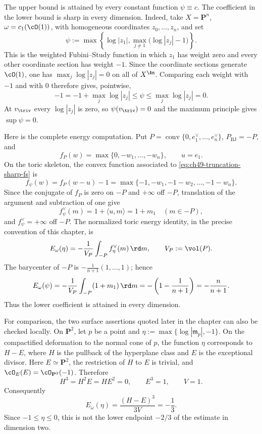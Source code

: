 \begin{remark}
\label{rem:ch49-truncation-sharp}
The upper bound is attained by every constant function $\psi\equiv c$.
The coefficient in the lower bound is sharp in every dimension.  Indeed,
take $X=\mathbf P^n$, $\omega=c_1(\cO(1))$, with homogeneous
coordinates $z_0,\ldots,z_n$, and set
\[
 \psi:=\max\!\left\{\log|z_1|,
              \max_{j\ne1}\bigl(\log|z_j|-1\bigr)\right\}.
\tag{49.6e}\label{eq:ch49-truncation-sharp-fs}
\]
This is the weighted Fubini--Study function in which $z_1$ has weight
zero and every other coordinate section has weight $-1$.  Since the
coordinate sections generate $\cO(1)$, one has
$\max_j\log|z_j|=0$ on all of $X^{\An}$.  Comparing each weight with
$-1$ and with $0$ therefore gives, pointwise,
\[
 -1=-1+\max_j\log|z_j|\le\psi
 \le\max_j\log|z_j|=0.
\]
At $v_{\triv}$ every $\log|z_j|$ is zero, so $\psi(v_{\triv})=0$
and the maximum principle gives $\sup\psi=0$.

Here is the complete energy computation.  Put
$P=\operatorname{conv}\{0,e_1^\vee,\ldots,e_n^\vee\}$,
$P_{\mathrm{BJ}}=-P$, and
\[
 f_P(w)=\max\{0,-w_1,\ldots,-w_n\},\qquad u=e_1.
\]
On the toric skeleton, the convex function associated to
\eqref{eq:ch49-truncation-sharp-fs} is
\[
 f_\psi(w)=f_P(w-u)-1
 =\max\{-1,-w_1,-1-w_2,\ldots,-1-w_n\}.
\]
Since the conjugate of $f_P$ is zero on $-P$ and $+\infty$
off $-P$, translation of the argument and subtraction of one give
\[
 f_\psi^\vee(m)=1+\langle u,m\rangle=1+m_1
 \quad(m\in-P),
\]
and $f_\psi^\vee=+\infty$ off $-P$.  The normalized toric energy
identity, in the precise convention of this chapter, is
\[
 E_\omega(\eta)=-\frac1{V_P}\int_{-P}f_\eta^\vee(m)\,\rd m,
 \qquad V_P:=\vol(P).
\]
The barycenter of $-P$ is
$-\frac1{n+1}(1,\ldots,1)$; hence
\[
 E_\omega(\psi)
 =-\frac1{V_P}\int_{-P}(1+m_1)\,\rd m
 =-\left(1-\frac1{n+1}\right)
 =-\frac n{n+1}.
\]
Thus the lower coefficient is attained in every dimension.

For comparison, the two surface assertions quoted later in the chapter
can also be checked locally.  On $\mathbf P^2$, let $p$ be a point
and
$\eta:=\max\{\log|\mathfrak m_p|,-1\}$.  On the compactified
deformation to the normal cone of $p$, the function $\eta$ corresponds
to $H-E$, where $H$ is the pullback of the hyperplane class and $E$
is the exceptional divisor.  Here $E\simeq\mathbf P^2$, the restriction
of $H$ to $E$ is trivial, and
$\cO_E(E)=\cO_{\mathbf P^2}(-1)$.  Therefore
\[
 H^3=H^2E=HE^2=0,\qquad E^3=1,\qquad V=1.
\]
Consequently
\[
 E_\omega(\eta)=\frac{(H-E)^3}{3V}=-\frac13.
\]
Since $-1\le\eta\le0$, this is not the lower endpoint $-2/3$ of the
estimate in dimension two.


\end{remark}
